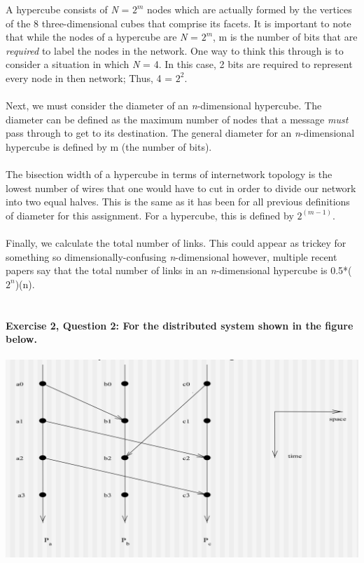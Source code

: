 \documentclass{article}
\begin{document}
A hypercube consists of \textit{N} = \textit{$2^m$} nodes which are actually formed by the vertices of the 8 three-dimensional cubes that comprise its facets. It is important to note that while the nodes of a hypercube are \textit{N} = \textit{$2^m$}, m is the number of bits that are \textit{required} to label the nodes in the network. One way to think this through is to consider a situation in which \textit{N} = 4. In this case, 2 bits are required to represent every node in then network; Thus, 4 = $2^2$. \\ \\ 
Next, we must consider the diameter of an \textit{n}-dimensional hypercube. The diameter can be defined as the maximum number of nodes that a message \textit{must} pass through to get to its destination. The general diameter for an \textit{n}-dimensional hypercube is defined by m (the number of bits). \\ \\
The bisection width of a hypercube in terms of internetwork topology is the lowest number of wires that one would have to cut in order to divide our network into two equal halves. This is the same as it has been for all previous definitions of diameter for this assignment. For a hypercube, this is defined by $2^{(m-1)}$.\\ \\
Finally, we calculate the total number of links. This could appear as trickey for something so dimensionally-confusing \textit{n}-dimensional however, multiple recent papers say that the total number of links in an \textit{n}-dimensional hypercube is 0.5*($2^n$)(n). 
\\ \\ \\
\textbf{Exercise 2, Question 2: For the distributed system shown in the figure below.}
\\ \\
\includegraphics[width=\textwidth,height=\textheight,keepaspectratio]{q2}
\end{document}
